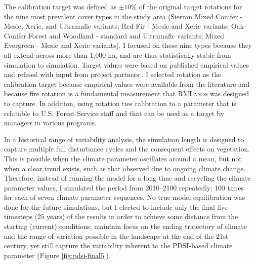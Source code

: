 The calibration target was defined as $\pm 10$\% of the original target rotations for the nine most prevalent cover types in the study area (Sierran Mixed Conifer - Mesic, Xeric, and Ultramafic variants; Red Fir - Mesic and Xeric variants; Oak-Conifer Forest and Woodland - standard and Ultramafic variants; Mixed Evergreen - Mesic and Xeric variants). I focused on these nine types because they all extend across more than 1,000 ha, and are thus statistically stable from simulation to simulation. Target values were based on published empirical values and refined with input from project partners \citep{Landfire2007,Mallek2013}. I selected rotation as the calibration target because empirical values were available from the literature and because fire rotation is a fundamental measurement that \textsc{RMLands} was designed to capture. In addition, using rotation ties calibration to a parameter that is relatable to U.S. Forest Service staff and that can be used as a target by managers in various programs.

In a historical range of variability analysis, the simulation length is designed to capture multiple full disturbance cycles and the consequent effects on vegetation. This is possible when the climate parameter oscillates around a mean, but not when a clear trend exists, such as that observed due to ongoing climate change. Therefore, instead of running the model for a long time and recycling the climate parameter values, I simulated the period from 2010--2100 repeatedly: 100 times for each of seven climate parameter sequences. No true model equilibration was done for the future simulations, but I elected to include only the final five timesteps (25 years) of the results in order to achieve some distance from the starting (current) conditions, maintain focus on the ending trajectory of climate and the range of variation possible in the landscape at the end of the 21st century, yet still capture the variability inherent to the PDSI-based climate parameter (Figure \ref{fig:pdsi-final5}).





